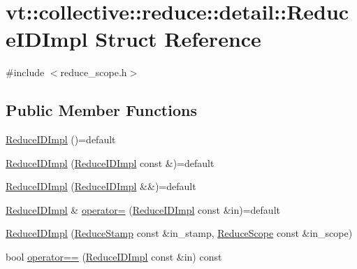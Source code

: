 \hypertarget{structvt_1_1collective_1_1reduce_1_1detail_1_1_reduce_i_d_impl}{}\section{vt\+:\+:collective\+:\+:reduce\+:\+:detail\+:\+:Reduce\+I\+D\+Impl Struct Reference}
\label{structvt_1_1collective_1_1reduce_1_1detail_1_1_reduce_i_d_impl}


{\ttfamily \#include $<$reduce\+\_\+scope.\+h$>$}

\subsection*{Public Member Functions}
\begin{DoxyCompactItemize}
\item 
\hyperlink{structvt_1_1collective_1_1reduce_1_1detail_1_1_reduce_i_d_impl_a02838391cc76625466de53c8197baead}{Reduce\+I\+D\+Impl} ()=default
\item 
\hyperlink{structvt_1_1collective_1_1reduce_1_1detail_1_1_reduce_i_d_impl_afc9000bf90d9cde00276e559a070bd17}{Reduce\+I\+D\+Impl} (\hyperlink{structvt_1_1collective_1_1reduce_1_1detail_1_1_reduce_i_d_impl}{Reduce\+I\+D\+Impl} const \&)=default
\item 
\hyperlink{structvt_1_1collective_1_1reduce_1_1detail_1_1_reduce_i_d_impl_a3476a2d196c68a45ffef12333e6cdf5d}{Reduce\+I\+D\+Impl} (\hyperlink{structvt_1_1collective_1_1reduce_1_1detail_1_1_reduce_i_d_impl}{Reduce\+I\+D\+Impl} \&\&)=default
\item 
\hyperlink{structvt_1_1collective_1_1reduce_1_1detail_1_1_reduce_i_d_impl}{Reduce\+I\+D\+Impl} \& \hyperlink{structvt_1_1collective_1_1reduce_1_1detail_1_1_reduce_i_d_impl_a96f5723202097c667e0c01a707528f82}{operator=} (\hyperlink{structvt_1_1collective_1_1reduce_1_1detail_1_1_reduce_i_d_impl}{Reduce\+I\+D\+Impl} const \&in)=default
\item 
\hyperlink{structvt_1_1collective_1_1reduce_1_1detail_1_1_reduce_i_d_impl_ac0e808d85213c4fedc3d1bae43744aed}{Reduce\+I\+D\+Impl} (\hyperlink{namespacevt_1_1collective_1_1reduce_1_1detail_aacc1fcd729d934ba143fee3a943bf9e7}{Reduce\+Stamp} const \&in\+\_\+stamp, \hyperlink{structvt_1_1collective_1_1reduce_1_1detail_1_1_reduce_scope}{Reduce\+Scope} const \&in\+\_\+scope)
\item 
bool \hyperlink{structvt_1_1collective_1_1reduce_1_1detail_1_1_reduce_i_d_impl_a9bcc8db2ce4c3c2cb2606a9bdd93debb}{operator==} (\hyperlink{structvt_1_1collective_1_1reduce_1_1detail_1_1_reduce_i_d_impl}{Reduce\+I\+D\+Impl} const \&in) const

\end{DoxyCompactItemize}
